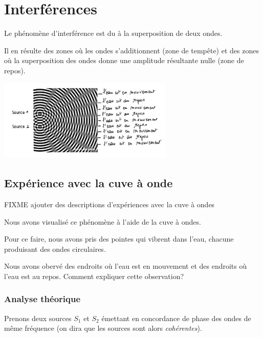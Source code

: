 \section{Interférences}

Le phénomène d'interférence est du à la superposition de deux
ondes.

Il en résulte des zones où les ondes s'additionnent (zone de
tempête) et des zones où la superposition des ondes donne une amplitude
résultante nulle (zone de repos).

\includegraphics[width=8.326cm,height=3.881cm]{Pictures/10000001000001A4000000C3DDA5D7BD0B699726.png}

\subsection{Expérience avec la cuve à onde}

FIXME ajouter des descriptions d'expériences avec la cuve à ondes

Nous avons visualisé ce phénomène à l'aide de la cuve à ondes.

Pour ce faire, nous avons pris des pointes qui vibrent dans l'eau,
chacune produisant des ondes circulaires.

Nous avons obervé des endroits où l'eau est en mouvement et des endroits
où l'eau est au repos. Comment expliquer cette observation?

\subsubsection{Analyse théorique}

Prenons deux sources $S_1$ et $S_2$ émettant
en concordance de phase des ondes de même fréquence (on dira que les
sources sont alors \emph{cohérentes}).

